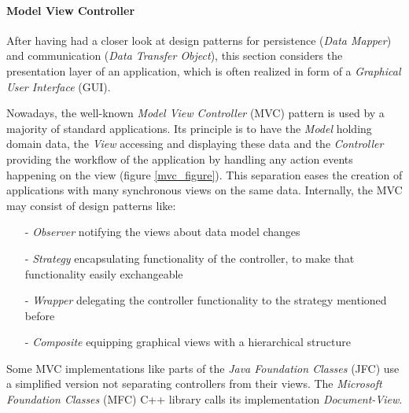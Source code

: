 %
%
%
%
%
%
%

\paragraph{Model View Controller}
\label{model_view_controller_heading}

After having had a closer look at design patterns for persistence
(\emph{Data Mapper}) and communication (\emph{Data Transfer Object}), this
section considers the presentation layer of an application, which is often
realized in form of a \emph{Graphical User Interface} (GUI).

Nowadays, the well-known \emph{Model View Controller} (MVC) pattern
\cite{buschmann,fowler2002} is used by a majority of standard applications.
Its principle is to have the \emph{Model} holding domain data, the \emph{View}
accessing and displaying these data and the \emph{Controller} providing the
workflow of the application by handling any action events happening on the view
(figure \ref{mvc_figure}). This separation eases the creation of applications
with many synchronous views on the same data. Internally, the MVC may consist
of design patterns like:

\begin{itemize}
    \item[-] \emph{Observer} notifying the views about data model changes
    \item[-] \emph{Strategy} \cite{gamma1995} encapsulating functionality
        of the controller, to make that functionality easily exchangeable
    \item[-] \emph{Wrapper} delegating the controller functionality to the
        strategy mentioned before
    \item[-] \emph{Composite} equipping graphical views with a hierarchical structure
\end{itemize}

Some MVC implementations like parts of the \emph{Java Foundation Classes} (JFC)
use a simplified version not separating controllers from their views. The
\emph{Microsoft Foundation Classes} (MFC) C++ library calls its implementation
\emph{Document-View}.

